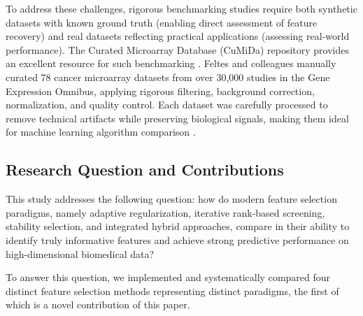 \documentclass[11pt]{article}
\begin{document}
To address these challenges, rigorous benchmarking studies require both synthetic datasets with known
ground truth (enabling direct assessment of feature recovery) and real datasets reflecting practical
applications (assessing real-world performance). The Curated Microarray Database (CuMiDa) repository
provides an excellent resource for such benchmarking \citep{feltes2019}. Feltes and colleagues
manually curated 78 cancer microarray datasets from over 30{,}000 studies in the Gene Expression
Omnibus, applying rigorous filtering, background correction, normalization, and quality control. Each
dataset was carefully processed to remove technical artifacts while preserving biological signals,
making them ideal for machine learning algorithm comparison \citep{feltes2019}.

\subsection{Research Question and Contributions}

This study addresses the following question: how do modern feature selection paradigms, namely
adaptive regularization, iterative rank-based screening, stability selection, and integrated hybrid
approaches, compare in their ability to identify truly informative features and achieve strong
predictive performance on high-dimensional biomedical data?

To answer this question, we implemented and systematically compared four distinct feature selection
methods representing distinct paradigms, the first of which is a novel contribution of this paper.
\end{document}
